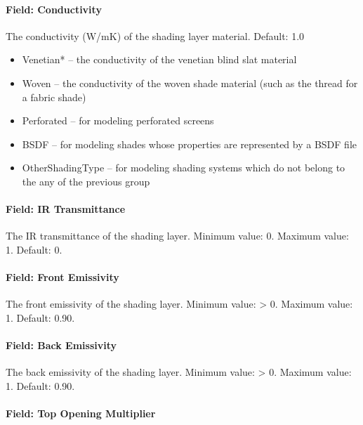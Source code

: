 \paragraph{Field: Conductivity}\label{field-conductivity-4}

The conductivity (W/mK) of the shading layer material. Default: 1.0

\begin{itemize}
\item
  Venetian* -- the conductivity of the venetian blind slat material
\item
  Woven -- the conductivity of the woven shade material (such as the thread for a fabric shade)
\item
  Perforated -- for modeling perforated screens
\item
  BSDF -- for modeling shades whose properties are represented by a BSDF file
\item
  OtherShadingType -- for modeling shading systems which do not belong to the any of the previous group
\end{itemize}

\paragraph{Field: IR Transmittance}\label{field-ir-transmittance}

The IR transmittance of the shading layer. Minimum value: 0. Maximum value: 1. Default: 0.

\paragraph{Field: Front Emissivity}\label{field-front-emissivity}

The front emissivity of the shading layer. Minimum value: > 0. Maximum value: 1. Default: 0.90.

\paragraph{Field: Back Emissivity}\label{field-back-emissivity}

The back emissivity of the shading layer. Minimum value: > 0. Maximum value: 1. Default: 0.90.

\paragraph{Field: Top Opening Multiplier}\label{field-top-opening-multiplier-1}

